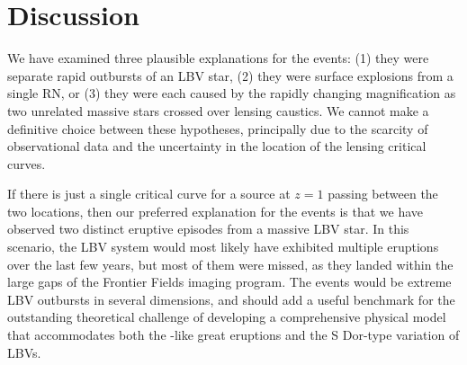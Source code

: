 \section{Discussion}\label{sec:Discussion}

We have examined three plausible explanations for the \spock events:
(1) they were separate rapid outbursts of an LBV star, (2) they were
surface explosions from a single RN, or (3) they were each caused by
the rapidly changing magnification as two unrelated massive stars
crossed over lensing caustics. We cannot make a definitive choice
between these hypotheses, principally due to the scarcity of
observational data and the uncertainty in the location of the
lensing critical curves.

If there is just a single critical curve for a source at $z=1$ passing
between the two \spock locations, then our preferred explanation for
the \spock events is that we have observed two distinct eruptive
episodes from a massive LBV star.
In this scenario, the \spock LBV system would most likely
have exhibited multiple eruptions over the last few years, but most of
them were missed, as they landed within the large gaps of the \HST
Frontier Fields imaging program.
The \spock events would be extreme LBV outbursts in several
dimensions, and should add a useful benchmark for the outstanding
theoretical challenge of developing a comprehensive physical model
that accommodates both the \etacar-like great eruptions and the S
Dor-type variation of LBVs.

